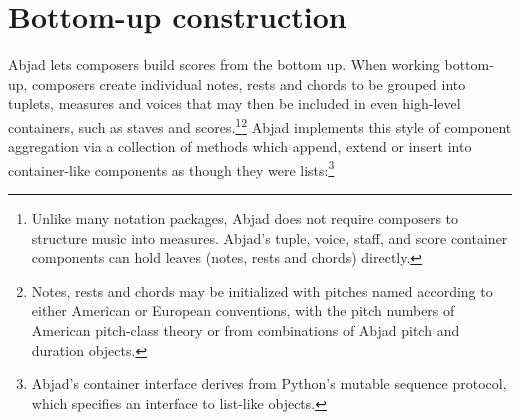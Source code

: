 \documentclass{article}
\begin{document}
\section{Bottom-up construction} \label{sec:bottom-up}

Abjad lets composers build scores from the bottom up. When working bottom-up,
composers create individual notes, rests and chords to be grouped into tuplets,
measures and voices that may then be included in even high-level containers,
such as staves and scores.\footnote{Unlike many notation packages, Abjad does
not require composers to structure music into measures. Abjad's tuple, voice,
staff, and score container components can hold leaves (notes, rests and chords)
directly.}\footnote{Notes, rests and chords may be initialized with pitches named according to either American or European conventions, with the pitch numbers of American pitch-class theory or from combinations of Abjad pitch and duration objects.} Abjad implements this style of component aggregation via a
collection of methods which append, extend or insert into container-like
components as though they were lists:\footnote{Abjad's container interface
derives from Python's mutable sequence protocol, which specifies an interface
to list-like objects.}

\end{document}
